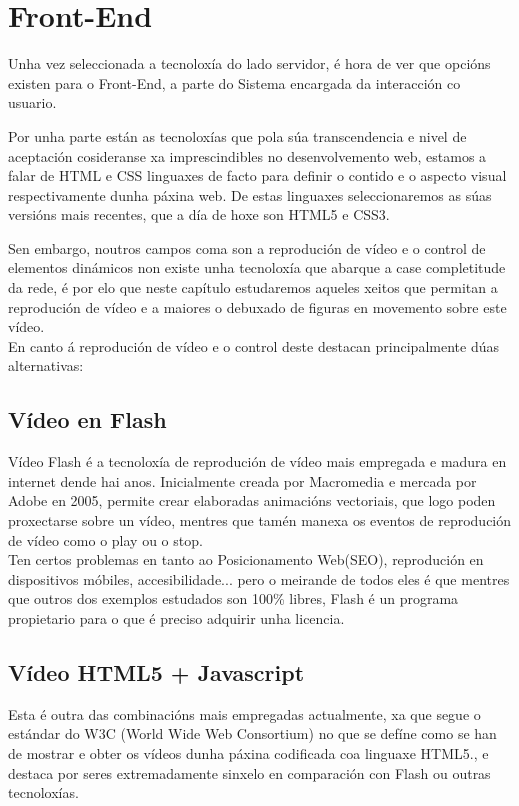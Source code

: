	
\section{Front-End}
	Unha vez seleccionada a tecnoloxía do lado servidor, é hora de ver que opcións existen para
	o Front-End, a parte do Sistema encargada da interacción co usuario.
	
	Por unha parte están as tecnoloxías que pola súa transcendencia e nivel de aceptación
	cosideranse xa imprescindibles no desenvolvemento web, estamos a falar de HTML e CSS linguaxes
	de facto para definir o contido e o aspecto visual respectivamente dunha páxina web.
	De estas linguaxes seleccionaremos as súas versións mais recentes, que a día de hoxe son HTML5 e
	CSS3.
	
	Sen embargo, noutros campos coma son a reprodución de vídeo e o control de elementos dinámicos
	non existe unha tecnoloxía que abarque a case completitude da rede, é por elo que neste capítulo
	estudaremos aqueles xeitos que permitan a reprodución de vídeo e a maiores o debuxado de 
	figuras en movemento sobre este vídeo.\\
	
	En canto á reprodución de vídeo e o control deste destacan principalmente dúas alternativas:
	
	\subsection{Vídeo en Flash}
		Vídeo Flash é a tecnoloxía de reprodución de vídeo mais empregada e madura en
		internet dende hai anos. Inicialmente creada por Macromedia e mercada por Adobe 
		en 2005, permite crear elaboradas animacións vectoriais, que logo poden proxectarse
		sobre un vídeo, mentres que tamén manexa os eventos de reprodución de vídeo como o 
		play ou o stop.\\
		
		Ten certos problemas en tanto ao Posicionamento Web(SEO), reprodución en 
		dispositivos móbiles, accesibilidade... pero o meirande de todos eles é que mentres
		que outros dos exemplos estudados son 100\% libres, Flash é un programa propietario
		para o que é preciso adquirir unha licencia.		
		
	
	\subsection{Vídeo HTML5 + Javascript}
		Esta é outra das combinacións mais empregadas actualmente, xa que segue o estándar
		do W3C (World Wide Web Consortium)\cite{w3schools-video-tag} no que se defíne como se
		han de mostrar e obter os vídeos dunha páxina codificada coa linguaxe HTML5., e 
		destaca por seres extremadamente sinxelo en comparación con Flash ou outras tecnoloxías.
		
